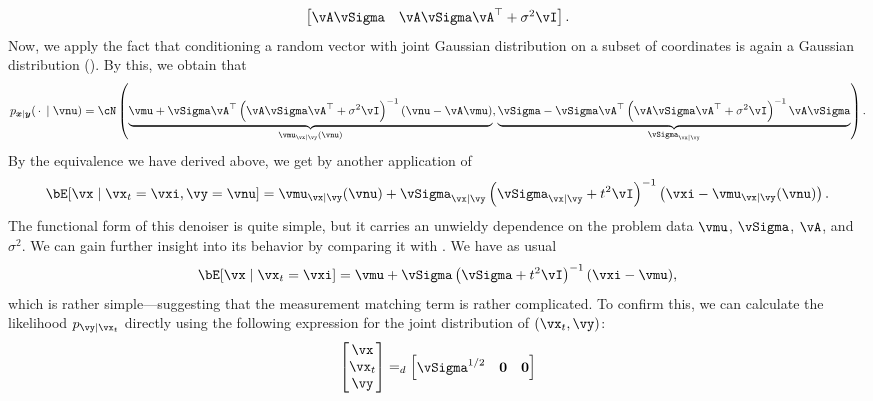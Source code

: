 \documentclass[../../book-main.tex]{subfiles}
\begin{document}
\begin{example}
\begin{equation*}
\begin{bmatrix}
      \vA \vSigma & \vA \vSigma \vA^\top + \sigma^2 \vI
    \end{bmatrix}.
  \end{equation*}
  Now, we apply the fact that conditioning a random vector with joint Gaussian
  distribution on a subset of coordinates is again a Gaussian distribution
  ().
  By this, we obtain that
  \begin{equation}
    p_{\x \mid \y}(\spcdot \mid \vnu) = \cN\left(
    \underbrace{%
      \vmu + \vSigma\vA^\top \left(\vA\vSigma\vA^\top + \sigma^2 \vI\right)^{-1} 
      (\vnu - \vA\vmu)}_{\vmu_{\vx \mid \vy}(\vnu)},
      \underbrace{%
      \vSigma - \vSigma \vA^\top \left(\vA\vSigma\vA^\top + \sigma^2
      \vI\right)^{-1} \vA \vSigma}_{\vSigma_{\vx\mid \vy}}
    \right).
  \end{equation}
  By the equivalence we have derived above, we get by another application of
  \begin{equation}\label{eq:conditional-posterior-denoiser-gaussian-case}
    \bE[ \vx \mid \vx_t=\vxi, \vy=\vnu ]
    =
    \vmu_{\vx\mid \vy}(\vnu) + \vSigma_{\vx\mid\vy}\left(
    \vSigma_{\vx\mid \vy} + t^2 \vI 
    \right)^{-1}\left(
    \vxi - \vmu_{\vx\mid \vy}(\vnu)
    \right).
  \end{equation}
  The functional form of this denoiser is quite simple, but it carries an
  unwieldy dependence on the problem data $\vmu$, $\vSigma$, $\vA$, and
  $\sigma^2$.
  We can gain further insight into its behavior by comparing it with
  .
  We have as usual
  \begin{equation}\label{eq:posterior-denoiser-gaussian-case}
    \bE[\vx \mid \vx_t=\vxi]
    = \vmu + \vSigma\left(\vSigma + t^2 \vI\right)^{-1} (\vxi - \vmu),
  \end{equation}
  which is rather simple---suggesting that the measurement matching term is
  rather complicated. To confirm this, we can calculate the likelihood $p_{\vy
  \mid \vx_t}$ directly using the following expression for the joint
  distribution of $(\vx_t, \vy)$:
  \begin{equation}
    \begin{bmatrix}
      \vx \\
      \vx_t \\
      \vy
    \end{bmatrix}
    =_{d}
    \begin{bmatrix}
      \vSigma^{1/2} & \Zero & \Zero \\

\end{bmatrix}
\end{equation}
\end{example}
\end{document}

